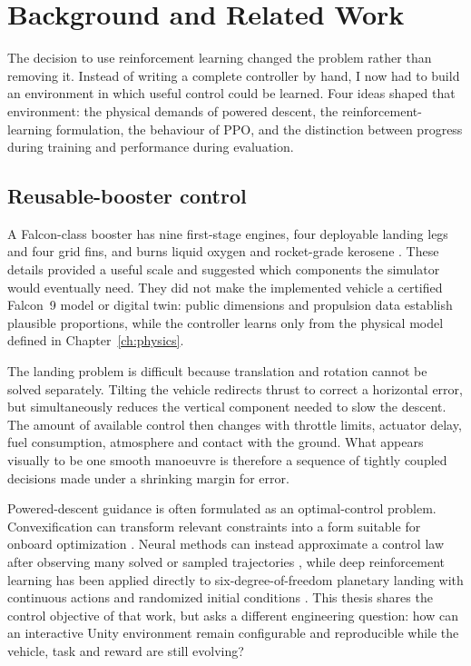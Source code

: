 \chapter{Background and Related Work}
\label{ch:background}

The decision to use reinforcement learning changed the problem rather than removing it. Instead
of writing a complete controller by hand, I now had to build an environment in which useful
control could be learned. Four ideas shaped that environment: the physical demands of powered
descent, the reinforcement-learning formulation, the behaviour of PPO, and the distinction
between progress during training and performance during evaluation.

\section{Reusable-booster control}

A Falcon-class booster has nine first-stage engines, four deployable landing legs and four grid
fins, and burns liquid oxygen and rocket-grade kerosene \cite{spacex2025falcon}. These details
provided a useful scale and suggested which components the simulator would eventually need.
They did not make the implemented vehicle a certified Falcon~9 model or digital twin: public
dimensions and propulsion data establish plausible proportions, while the controller learns
only from the physical model defined in Chapter~\ref{ch:physics}.

The landing problem is difficult because translation and rotation cannot be solved separately.
Tilting the vehicle redirects thrust to correct a horizontal error, but simultaneously reduces
the vertical component needed to slow the descent. The amount of available control then changes
with throttle limits, actuator delay, fuel consumption, atmosphere and contact with the ground.
What appears visually to be one smooth manoeuvre is therefore a sequence of tightly coupled
decisions made under a shrinking margin for error.

Powered-descent guidance is often formulated as an optimal-control problem. Convexification can
transform relevant constraints into a form suitable for onboard optimization
\cite{acikmese2007convex}. Neural methods can instead approximate a control law after observing
many solved or sampled trajectories \cite{sanchez2018dnncontrol}, while deep reinforcement
learning has been applied directly to six-degree-of-freedom planetary landing with continuous
actions and randomized initial conditions \cite{gaudet2020landing}. This thesis shares the
control objective of that work, but asks a different engineering question: how can an
interactive Unity environment remain configurable and reproducible while the vehicle, task and
reward are still evolving?

